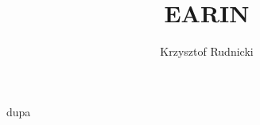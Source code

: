 \documentclass{article}
\title{EARIN}
\author{Krzysztof Rudnicki}
\begin{document}
\maketitle
dupa
\end{document}
